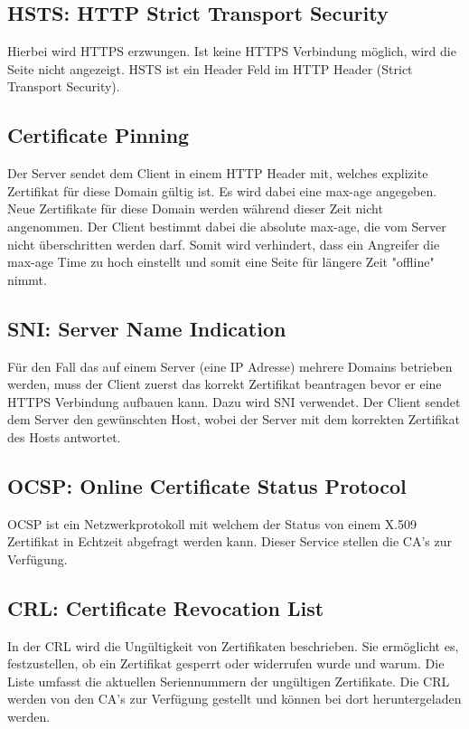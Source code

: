\subsection{HSTS: HTTP Strict Transport Security}
Hierbei wird HTTPS erzwungen. Ist keine HTTPS Verbindung möglich, wird die Seite nicht angezeigt. HSTS ist ein Header Feld im HTTP Header (Strict Transport Security).  

\subsection{Certificate Pinning}
Der Server sendet dem Client in einem HTTP Header mit, welches explizite Zertifikat für diese Domain gültig ist. Es wird dabei eine max-age angegeben. Neue Zertifikate für diese Domain werden während dieser Zeit nicht angenommen. Der Client bestimmt dabei die absolute max-age, die vom Server nicht überschritten werden darf. Somit wird verhindert, dass ein Angreifer die max-age Time zu hoch einstellt und somit eine Seite für längere Zeit "offline" nimmt.

\subsection{SNI: Server Name Indication}
Für den Fall das auf einem Server (eine IP Adresse) mehrere Domains betrieben werden, muss der Client zuerst das korrekt Zertifikat beantragen bevor er eine HTTPS Verbindung aufbauen kann. Dazu wird SNI verwendet. Der Client sendet dem Server den gewünschten Host, wobei der Server mit dem korrekten Zertifikat des Hosts antwortet.

\subsection{OCSP: Online Certificate Status Protocol}
OCSP ist ein Netzwerkprotokoll mit welchem der Status von einem X.509 Zertifikat in Echtzeit abgefragt werden kann. Dieser Service stellen die CA's zur Verfügung.  

\subsection{CRL: Certificate Revocation List}
In der CRL wird die Ungültigkeit von Zertifikaten beschrieben. Sie ermöglicht es, festzustellen, ob ein Zertifikat gesperrt oder widerrufen wurde und warum. Die Liste umfasst die aktuellen Seriennummern der ungültigen Zertifikate. Die CRL werden von den CA's zur Verfügung gestellt und können bei dort heruntergeladen werden.

